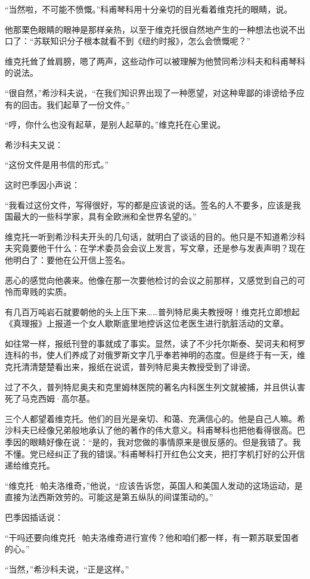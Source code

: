 “当然啦，不可能不愤慨。”科甫琴科用十分亲切的目光看着维克托的眼睛，说。

他那栗色眼睛的眼神是那样亲热，以至于维克托很自然地产生的一种想法也说不出口了：“苏联知识分子根本就看不到《纽约时报》，怎么会愤慨呢？”

维克托耸了耸肩膀，嗯了两声，这些动作可以被理解为他赞同希沙科夫和科甫琴科的说法。

“很自然，”希沙科夫说，“在我们知识界出现了一种愿望，对这种卑鄙的诽谤给予应有的回击。我们起草了一份文件。”

“哼，你什么也没有起草，是别人起草的。”维克托在心里说。

希沙科夫又说：

“这份文件是用书信的形式。”

这时巴季因小声说：

“我看过这份文件，写得很好，写的都是应该说的话。签名的人不要多，应该是我国最大的一些科学家，具有全欧洲和全世界名望的。”

维克托一听到希沙科夫开头的几句话，就明白了谈话的目的。他只是不知道希沙科夫究竟要他干什么：在学术委员会会议上发言，写文章，还是参与发表声明？现在他明白了：要他在公开信上签名。

恶心的感觉向他袭来。他像在那一次要他检讨的会议之前那样，又感觉到自己的可怜而卑贱的实质。

有几百万吨岩石就要朝他的头上压下来……普列特尼奥夫教授呀！维克托立即想起《真理报》上报道一个女人歇斯底里地控诉这位老医生进行肮脏活动的文章。

如往常一样，报纸刊登的事就成了事实。显然，读了不少托尔斯泰、契诃夫和柯罗连科的书，使人们养成了对俄罗斯文字几乎奉若神明的态度。但是终于有一天，维克托清清楚楚看出来，报纸在说谎，普列特尼奥夫教授受到了诽谤。

过了不久，普列特尼奥夫和克里姆林医院的著名内科医生列文就被捕，并且供认害死了马克西姆·高尔基。

三个人都望着维克托。他们的目光是亲切、和蔼、充满信心的。他是自己人嘛。希沙科夫已经像兄弟般地承认了他的著作的伟大意义。科甫琴科也把他看得很高。巴季因的眼睛好像在说：“是的，我对您做的事情原来是很反感的。但是我错了。我不懂。党已经纠正了我的错误。”科甫琴科打开红色公文夹，把打字机打好的公开信递给维克托。

“维克托·帕夫洛维奇，”他说，“应该告诉您，英国人和美国人发动的这场运动，是直接为法西斯效劳的。可能这是第五纵队的间谍策动的。”

巴季因插话说：

“干吗还要向维克托·帕夫洛维奇进行宣传？他和咱们都一样，有一颗苏联爱国者的心。”

“当然，”希沙科夫说，“正是这样。”

